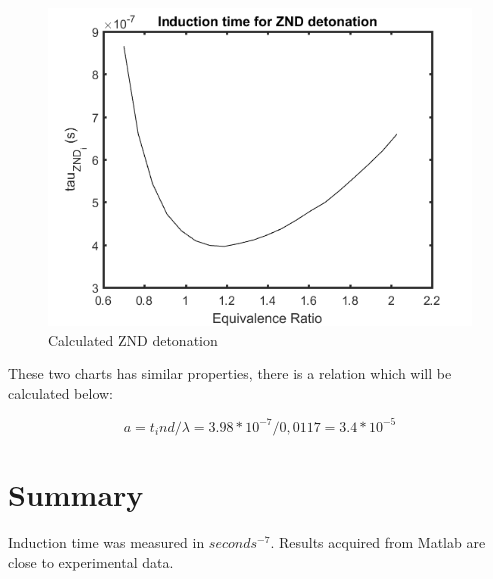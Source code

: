 \documentclass[a4paper]{article}
\begin{document}
\begin{figure}[H]
\includegraphics[width=1\textwidth]{znd_it.png}
\caption{\label{fig:p}Calculated ZND detonation}
\end{figure}

These two charts has similar properties, there is a relation which will be calculated below:

\begin{equation}
    a = t_ind/\lambda=3.98*10^{-7}/0,0117=3.4*10^{-5}
 \end{equation}   

\section{Summary}\label{sec:summary}
 Induction time was measured in $seconds^{-7}$. Results acquired from Matlab are close to experimental data.
\end{document}
